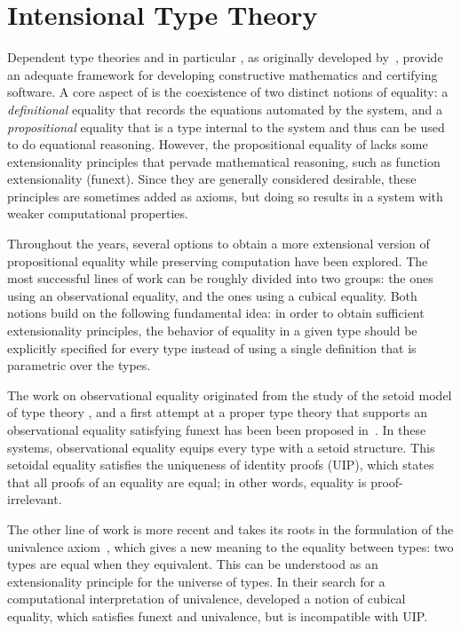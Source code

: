 \setchapterpreamble[u]{\margintoc}
\chapter{Intensional Type Theory}

Dependent type theories and in particular \MLTT, as originally
developed by~, provide an adequate framework
for developing constructive mathematics and certifying software.
%
A core aspect of \MLTT is the coexistence of two distinct notions of
equality: a \emph{definitional} equality that records the equations
automated by the system, and a \emph{propositional} equality that is
a type internal to the system and thus can be used to do equational
reasoning.
%
However, the propositional equality of \MLTT lacks some extensionality
principles that pervade mathematical reasoning, such as function
extensionality (funext). Since they are generally considered desirable, these
principles are sometimes added as axioms, but doing so results in a system
with weaker computational properties.

Throughout the years, several options
to obtain a more extensional version of propositional equality while preserving
computation have been explored. The most successful lines of work can be roughly divided into two
groups: the ones using an observational equality, and the ones using a
cubical equality.
%
Both notions build on the following fundamental idea: in order to obtain
sufficient extensionality principles, the behavior of equality in a given
type should be explicitly specified for every type instead of using a single
definition that is parametric over the types.

The work on observational equality originated from the study of
the setoid model of type theory , and
a first attempt at a proper type theory that supports an observational
equality satisfying funext has been been proposed in~.
%
In these systems, observational equality equips every type with a setoid
structure. This setoidal equality satisfies the uniqueness of identity proofs (UIP),
which states that all proofs of an equality are equal; in other words,
equality is proof-irrelevant.

The other line of work is more recent and takes its roots in the
formulation of the univalence axiom~,
which gives a new meaning to the equality between types: two types are
equal when they equivalent. This can be understood as an extensionality
principle for the universe of types.
%
In their search for a computational interpretation of
univalence,  developed a notion of cubical equality,
which satisfies funext and univalence, but is incompatible with UIP.

